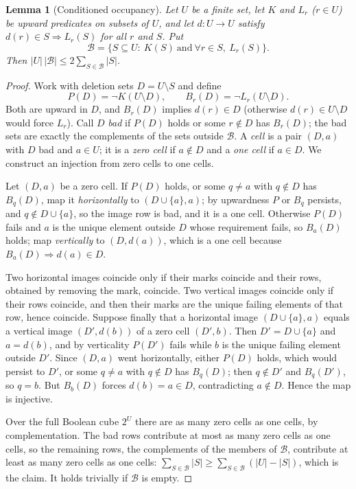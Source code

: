 \documentclass[11pt,a4paper]{article}
\theoremstyle{plain}
\newtheorem{lemma}[theorem]{Lemma}
\theoremstyle{definition}
\theoremstyle{remark}
\newcommand{\BB}{\mathcal B}
\begin{document}
\begin{lemma}[Conditioned occupancy]\label{lem:count}
Let $U$ be a finite set, let $K$ and $L_r$ ($r\in U$) be upward predicates on subsets of $U$, and let $d:U\to U$ satisfy $d(r)\in S\Rightarrow L_r(S)$ for all $r$ and $S$. Put
\[
 \BB=\{S\subseteq U:\ K(S)\ \text{and}\ \forall r\in S,\ L_r(S)\}.
\]
Then $|U|\,|\BB|\le2\sum_{S\in\BB}|S|$.
\end{lemma}
\begin{proof}
Work with deletion sets $D=U\setminus S$ and define
\[
 P(D)=\neg K(U\setminus D),\qquad B_r(D)=\neg L_r(U\setminus D).
\]
Both are upward in $D$, and $B_r(D)$ implies $d(r)\in D$ (otherwise $d(r)\in U\setminus D$ would force $L_r$). Call $D$ \emph{bad} if $P(D)$ holds or some $r\notin D$ has $B_r(D)$; the bad sets are exactly the complements of the sets outside $\BB$. A \emph{cell} is a pair $(D,a)$ with $D$ bad and $a\in U$; it is a \emph{zero cell} if $a\notin D$ and a \emph{one cell} if $a\in D$. We construct an injection from zero cells to one cells.

Let $(D,a)$ be a zero cell. If $P(D)$ holds, or some $q\ne a$ with $q\notin D$ has $B_q(D)$, map it \emph{horizontally} to $(D\cup\{a\},a)$; by upwardness $P$ or $B_q$ persists, and $q\notin D\cup\{a\}$, so the image row is bad, and it is a one cell. Otherwise $P(D)$ fails and $a$ is the unique element outside $D$ whose requirement fails, so $B_a(D)$ holds; map \emph{vertically} to $(D,d(a))$, which is a one cell because $B_a(D)\Rightarrow d(a)\in D$.

Two horizontal images coincide only if their marks coincide and their rows, obtained by removing the mark, coincide. Two vertical images coincide only if their rows coincide, and then their marks are the unique failing elements of that row, hence coincide. Suppose finally that a horizontal image $(D\cup\{a\},a)$ equals a vertical image $(D',d(b))$ of a zero cell $(D',b)$. Then $D'=D\cup\{a\}$ and $a=d(b)$, and by verticality $P(D')$ fails while $b$ is the unique failing element outside $D'$. Since $(D,a)$ went horizontally, either $P(D)$ holds, which would persist to $D'$, or some $q\ne a$ with $q\notin D$ has $B_q(D)$; then $q\notin D'$ and $B_q(D')$, so $q=b$. But $B_b(D)$ forces $d(b)=a\in D$, contradicting $a\notin D$. Hence the map is injective.

Over the full Boolean cube $2^U$ there are as many zero cells as one cells, by complementation. The bad rows contribute at most as many zero cells as one cells, so the remaining rows, the complements of the members of $\BB$, contribute at least as many zero cells as one cells: $\sum_{S\in\BB}|S|\ge\sum_{S\in\BB}(|U|-|S|)$, which is the claim. It holds trivially if $\BB$ is empty.
\end{proof}
\end{document}

